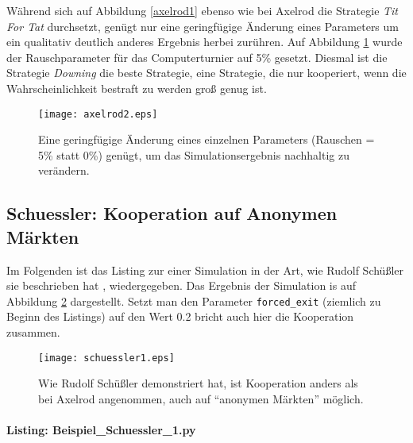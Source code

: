 \documentclass[12pt,a4paper,ngerman]{article}
\begin{document}
Während sich auf Abbildung \ref{axelrod1} ebenso wie bei Axelrod die
Strategie {\em Tit For Tat} durchsetzt, genügt nur eine geringfügige
Änderung eines Parameters um ein qualitativ deutlich anderes Ergebnis
herbei zurühren. Auf Abbildung \ref{axelrod2} wurde der
Rauschparameter für das Computerturnier auf 5\% gesetzt. Diesmal ist
die Strategie {\em Downing} die beste Strategie, eine Strategie, die
nur kooperiert, wenn die Wahrscheinlichkeit bestraft zu werden groß
genug ist.

\begin{figure} 
\begin{center} 
\texttt{[image: axelrod2.eps]}
\caption{\label{axelrod2} Eine geringfügige Änderung eines einzelnen
  Parameters (Rauschen = 5\% statt 0\%) genügt, um das
  Simulationsergebnis nachhaltig zu verändern.}
\end{center}
\end{figure}


\subsection{Schuessler: Kooperation auf Anonymen Märkten}
\label{Beispiele_Schuessler}

Im Folgenden ist das Listing zur einer Simulation in der Art, wie Rudolf
Schüßler sie beschrieben hat \cite{schuessler:1997}, wiedergegeben.
Das Ergebnis der Simulation is auf Abbildung \ref{schuessler1}
dargestellt. Setzt man den Parameter {\tt forced\_exit} (ziemlich zu
Beginn des Listings) auf den Wert 0.2 bricht auch hier die Kooperation
zusammen.

\begin{figure}
\begin{center}
\texttt{[image: schuessler1.eps]}
\caption{\label{schuessler1} Wie Rudolf Schüßler
 \cite{schuessler:1997} demonstriert hat, ist Kooperation anders als
 bei Axelrod \cite{axelrod:1984} angenommen, auch auf "`anonymen
 Märkten"' möglich.}
\end{center}
\end{figure}

\newpage

\paragraph{Listing: Beispiel\_Schuessler\_1.py}
\end{document}

